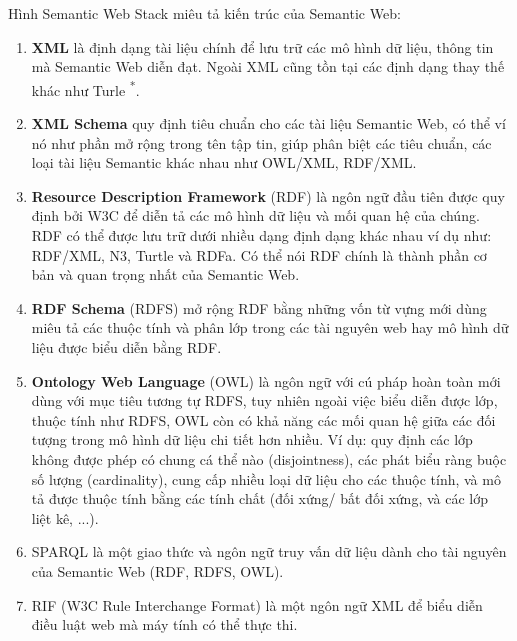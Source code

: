 Hình Semantic Web Stack \cite{semantic3} miêu tả kiến trúc của Semantic Web:
\begin{enumerate}
	\item \textbf{XML} là định dạng tài liệu chính để lưu trữ các mô hình dữ liệu, thông tin mà Semantic Web diễn đạt. Ngoài XML cũng tồn tại các định dạng thay thế khác như Turle \textsuperscript{*}. 
	\item \textbf{XML Schema} quy định tiêu chuẩn cho các tài liệu Semantic Web, có thể ví nó như phần mở rộng trong tên tập tin, giúp phân biệt các tiêu chuẩn, các loại tài liệu Semantic khác nhau như OWL/XML, RDF/XML.
	\item \textbf{Resource Description Framework} (RDF) \cite{rdf} là ngôn ngữ đầu tiên được quy định bởi W3C để diễn tả các mô hình dữ liệu và mối quan hệ của chúng. RDF có thể được lưu trữ dưới nhiều dạng định dạng khác nhau  ví dụ như: RDF/XML, N3, Turtle và RDFa. Có thể nói RDF chính là thành phần cơ bản và quan trọng nhất của Semantic Web.
	\item \textbf{RDF Schema} (RDFS) \cite{rdfs} mở rộng RDF bằng những vốn từ vựng mới dùng miêu tả các thuộc tính và phân lớp trong các tài nguyên web hay mô hình dữ liệu được biểu diễn bằng RDF.
	\item \textbf{Ontology Web Language} (OWL) là ngôn ngữ với cú pháp hoàn toàn mới dùng với mục tiêu tương tự RDFS, tuy nhiên ngoài việc biểu diễn được lớp, thuộc tính như RDFS, OWL còn có khả năng các mối quan hệ giữa các đối tượng trong mô hình dữ liệu chi tiết hơn nhiều. Ví dụ: quy định các lớp không được phép có chung cá thể nào (disjointness), các phát biểu ràng buộc số lượng (cardinality), cung cấp nhiều loại dữ liệu cho các thuộc tính, và mô tả được thuộc tính bằng các tính chất (đối xứng/ bất đối xứng, và các lớp liệt kê, ...).
	\item SPARQL là một giao thức và ngôn ngữ truy vấn dữ liệu dành cho tài nguyên của Semantic Web (RDF, RDFS, OWL).
	\item RIF (W3C Rule Interchange Format) là một ngôn ngữ XML để biểu diễn điều luật web mà máy tính có thể thực thi.
\end{enumerate}
{\let\thefootnote\relax{}
}
